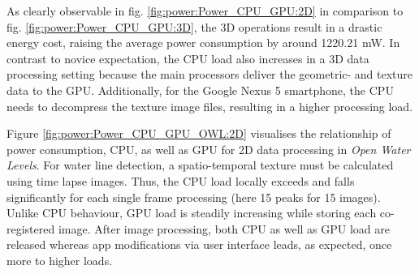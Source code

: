 \documentclass[review]{elsarticle}
\begin{document}

As clearly observable in fig. \ref{fig:power:Power_CPU_GPU:2D} in comparison to fig. \ref{fig:power:Power_CPU_GPU:3D}, the 3D operations result in a drastic energy cost, raising the average power consumption by around 1220.21 mW. In contrast to novice expectation, the \gls{CPU} load also increases in a 3D data processing setting because the main processors deliver the geometric- and texture data to the \gls{GPU}. Additionally, for the Google Nexus 5 smartphone, the \gls{CPU} needs to decompress the texture image files, resulting in a higher processing load.

Figure \ref{fig:power:Power_CPU_GPU_OWL:2D} visualises the relationship of power consumption, \gls{CPU}, as well as \gls{GPU} for 2D data processing in \textit{Open Water Levels}. For water line detection, a spatio-temporal texture must be calculated using time lapse images. Thus, the CPU load locally exceeds and falls significantly for each single frame processing (here 15 peaks for 15 images). Unlike \gls{CPU} behaviour, \gls{GPU} load is steadily increasing while storing each co-registered image. After image processing, both \gls{CPU} as well as \gls{GPU} load are released whereas app modifications via user interface leads, as expected, once more to higher loads.

\end{document}
